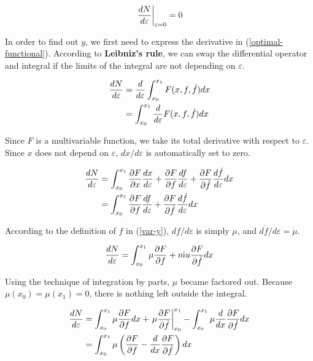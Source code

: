 \begin{equation}
	\left.dN\over d\varepsilon\right|_{\varepsilon=0}=0
	\label{optimal-functional}
\end{equation}

In order to find out $y$, we first need to express the derivative in
(\ref{optimal-functional}). According to \textbf{Leibniz's rule}, we can swap
the differential operator and integral if the limits of the integral are
not depending on $\varepsilon$.

$$
\begin{aligned}
	{dN\over d\varepsilon}
	&={d\over d\varepsilon}\int_{x_0}^{x_1}F(x,f,\dot{f})dx \\
	&=\int_{x_0}^{x_1}{d\over d\varepsilon}F(x,f,\dot{f})dx
\end{aligned}
$$

Since $F$ is a multivariable function, we take its total derivative with
respect to $\varepsilon$. Since $x$ does not depend on $\varepsilon$,
$dx/d\varepsilon$ is automatically set to zero.

$$
\begin{aligned}
	{dN\over d\varepsilon}
	&=\int_{x_0}^{x_1}{\partial F\over\partial x}
	{dx\over d\varepsilon}+{\partial F\over\partial f}
	{df\over d\varepsilon}+{\partial F\over\partial\dot{f}}
	{d\dot{f}\over d\varepsilon}dx \\
	&=\int_{x_0}^{x_1}{\partial F\over\partial f}{df\over d\varepsilon}
	+{\partial F\over\partial\dot{f}}{d\dot{f}\over d\varepsilon}dx
\end{aligned}
$$

According to the definition of $f$ in (\ref{var-y}), $df/d\varepsilon$ is
simply $\mu$, and $d\dot{f}/d\varepsilon=\dot{\mu}$.

$$
{dN\over d\varepsilon}=\int_{x_0}^{x_1}\mu{\partial F\over\partial f}
+\dot{mu}{\partial F\over\partial\dot{f}}dx
$$

Using the technique of integration by parts, $\mu$ became factored out. Because
$\mu(x_0)=\mu(x_1)=0$, there is nothing left outside the integral.

$$
\begin{aligned}
	{dN\over d\varepsilon}
	&=\int_{x_0}^{x_1}\mu{\partial F\over\partial f}dx+
	\left.\mu{\partial F\over\partial\dot{f}}\right|_{x_0}^{x_1}
	-\int_{x_0}^{x_1}\mu{d\over dx}{\partial F\over\partial\dot{f}}dx \\
	&=\int_{x_0}^{x_1}\mu\left({\partial F\over\partial f}-
	{d\over dx}{\partial F\over\partial\dot{f}}\right)dx
\end{aligned}
$$

